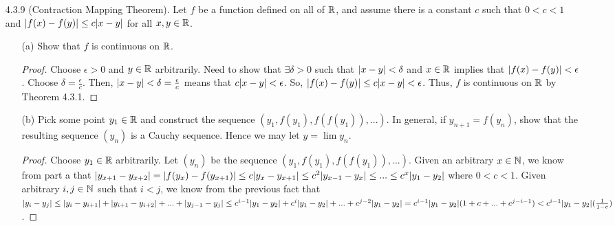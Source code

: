 \documentclass[12pt,letterpaper]{article}
\begin{document}
\begin{itemize}[leftmargin=!,labelindent=5pt]
\begin{itemize}
\begin{proof}
                        So, $f$ and $g$ are defined on all of $\bbR$ and $f(r) = g(r)$ at every rational point $r$.
                        However, $f$ and $g$ are not the same function.
                    \end{proof}
            \end{itemize}
        \item [4.3.9] (Contraction Mapping Theorem). Let $f$ be a function defined on all of $\bbR$, and assume there is a constant $c$ such that $0 < c < 1$ and $\abs{f(x) - f(y)} \leq c\abs{x-y}$ for all $x, y \in \mathbb{R}$.
            \begin{itemize}
                \item [(a)] Show that $f$ is continuous on $\bbR$.
                    \begin{proof}
                        Choose $\epsilon > 0$ and $y \in \mathbb{R}$ arbitrarily.
                        Need to show that $\exists \delta > 0$ such that $\abs{x - y} < \delta$ and $x \in \mathbb{R}$ implies that $\abs{f(x) - f(y)} < \epsilon$.
                        Choose $\delta = \frac{\epsilon}{c}$.
                        Then, $\abs{x - y} < \delta = \frac{\epsilon}{c}$ means that $c\abs{x-y} < \epsilon$.
                        So, $\abs{f(x) - f(y)} \leq c\abs{x-y} < \epsilon$.
                        Thus, $f$ is continuous on $\bbR$ by Theorem 4.3.1.
                    \end{proof}
                \item [(b)] Pick some point $y_1 \in \mathbb{R}$ and construct the sequence $(y_1, f(y_1), f(f(y_1)), ...)$. In general, if $y_{n+1} = f(y_n)$, show that the resulting sequence $(y_n)$ is a Cauchy sequence. Hence we may let $y = \lim y_n$.
                    \begin{proof}
                        Choose $y_1 \in \mathbb{R}$ arbitrarily.
                        Let $(y_n)$ be the sequence $(y_1, f(y_1), f(f(y_1)), ...)$.
                        Given an arbitrary $x \in \mathbb{N}$, we know from part a that $\abs{y_{x+1} - y_{x+2}} = \abs{f(y_{x}) - f(y_{x+1})} \leq c\abs{y_x - y_{x+1}} \leq c^2\abs{y_{x-1} - y_{x}} \leq ... \leq c^x\abs{y_{1} - y_{2}}$ where $0<c<1$.
                        Given arbitrary $i,j \in \mathbb{N}$ such that $i < j$, we know from the previous fact that $\abs{y_i - y_j} \leq \abs{y_i - y_{i+1}} + \abs{y_{i+1} - y_{i+2}} + ... + \abs{y_{j-1} - y_j} \leq c^{i-1}\abs{y_{1} - y_{2}} + c^i\abs{y_{1} - y_{2}} + ... + c^{j-2}\abs{y_{1} - y_{2}} = c^{i-1}\abs{y_{1} - y_{2}}(1 + c + ... + c^{j-i-1}) < c^{i-1}\abs{y_{1} - y_{2}}(\frac{1}{1-c})$.

\end{proof}
\end{itemize}
\end{itemize}
\end{document}
